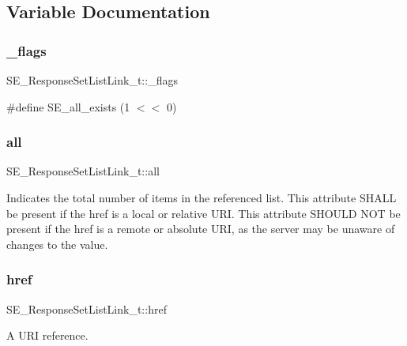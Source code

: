 \subsection{Variable Documentation}
\mbox{\label{group__ResponseSetListLink_gac0a7f9313464899bf0f7ce52ebccb127}} 
\subsubsection{\texorpdfstring{\+\_\+flags}{\_flags}}
{\footnotesize\ttfamily S\+E\+\_\+\+Response\+Set\+List\+Link\+\_\+t\+::\+\_\+flags}

\#define S\+E\+\_\+all\+\_\+exists (1 $<$$<$ 0) \mbox{\label{group__ResponseSetListLink_ga7803a9cad6f20a2c92bd6fb19237adb9}} 
\subsubsection{\texorpdfstring{all}{all}}
{\footnotesize\ttfamily S\+E\+\_\+\+Response\+Set\+List\+Link\+\_\+t\+::all}

Indicates the total number of items in the referenced list. This attribute S\+H\+A\+LL be present if the href is a local or relative U\+RI. This attribute S\+H\+O\+U\+LD N\+OT be present if the href is a remote or absolute U\+RI, as the server may be unaware of changes to the value. \mbox{\label{group__ResponseSetListLink_ga03c5ac2bc319d804b19972bf181a7ffb}} 
\subsubsection{\texorpdfstring{href}{href}}
{\footnotesize\ttfamily S\+E\+\_\+\+Response\+Set\+List\+Link\+\_\+t\+::href}

A U\+RI reference. 
